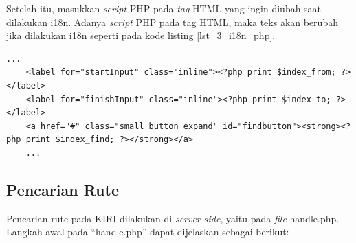 Setelah itu, masukkan \textit{script} PHP pada \textit{tag} HTML yang ingin diubah saat dilakukan i18n. Adanya \textit{script} PHP pada tag HTML, maka teks akan berubah jika dilakukan i18n seperti pada kode listing \ref{lst_3_i18n_php}.

\begin{lstlisting}[caption=Script PHP untuk Internationalization,label = {lst_3_i18n_php}]
	...
	<label for="startInput" class="inline"><?php print $index_from; ?></label>
	<label for="finishInput" class="inline"><?php print $index_to; ?></label>
	<a href="#" class="small button expand" id="findbutton"><strong><?php print $index_find; ?></strong></a>
	...
\end{lstlisting}

\subsection{Pencarian Rute}
Pencarian rute pada KIRI dilakukan di \textit{server side}, yaitu pada \textit{file} handle.php. Langkah awal pada ``handle.php'' dapat dijelaskan sebagai berikut:
